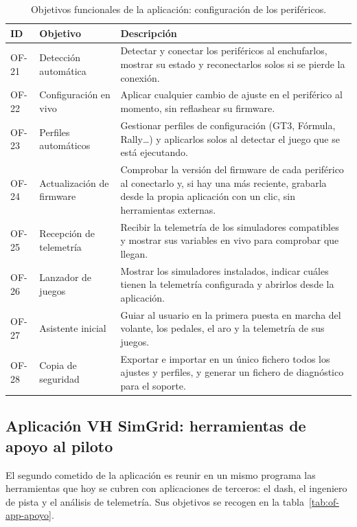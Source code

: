 \begin{table}[htbp]
	\centering
	\caption{Objetivos funcionales de la aplicación: configuración de los periféricos.}
	\label{tab:of-app-config}
	\small
	\begin{tabularx}{\textwidth}{@{}l>{\raggedright\arraybackslash}p{3.6cm}X@{}}
		\toprule
		\textbf{ID} & \textbf{Objetivo} & \textbf{Descripción} \\
		\midrule
		OF-21 & Detección automática &
		Detectar y conectar los periféricos al enchufarlos, mostrar su estado y reconectarlos solos si se pierde la conexión. \\
		OF-22 & Configuración en vivo &
		Aplicar cualquier cambio de ajuste en el periférico al momento, sin reflashear su firmware. \\
		OF-23 & Perfiles automáticos &
		Gestionar perfiles de configuración (GT3, Fórmula, Rally\ldots) y aplicarlos solos al detectar el juego que se está ejecutando. \\
		OF-24 & Actualización de firmware &
		Comprobar la versión del firmware de cada periférico al conectarlo y, si hay una más reciente, grabarla desde la propia aplicación con un clic, sin herramientas externas. \\
		OF-25 & Recepción de telemetría &
		Recibir la telemetría de los simuladores compatibles y mostrar sus variables en vivo para comprobar que llegan. \\
		OF-26 & Lanzador de juegos &
		Mostrar los simuladores instalados, indicar cuáles tienen la telemetría configurada y abrirlos desde la aplicación. \\
		OF-27 & Asistente inicial &
		Guiar al usuario en la primera puesta en marcha del volante, los pedales, el aro y la telemetría de sus juegos. \\
		OF-28 & Copia de seguridad &
		Exportar e importar en un único fichero todos los ajustes y perfiles, y generar un fichero de diagnóstico para el soporte. \\
		\bottomrule
	\end{tabularx}
\end{table}

\subsection{Aplicación VH SimGrid: herramientas de apoyo al piloto}
\label{subsec:of-app-apoyo}

El segundo cometido de la aplicación es reunir en un mismo programa las herramientas que hoy se cubren con aplicaciones de terceros: el dash, el ingeniero de pista y el análisis de telemetría. Sus objetivos se recogen en la tabla~\ref{tab:of-app-apoyo}.

